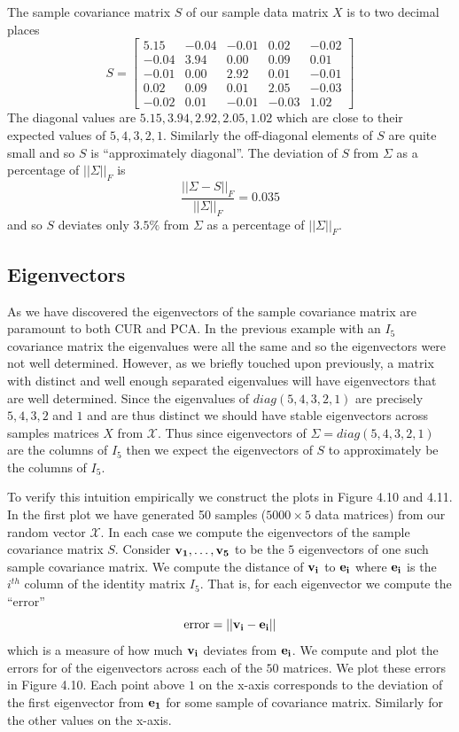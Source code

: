 \documentclass{book}
\newcommand{\bs}[1]{\boldsymbol{#1}}
\newcommand{\rv}[1]{\bs{\mathscr{#1}}}
\begin{document}
The sample covariance matrix $S$ of our sample data matrix $X$ is to two decimal places
$$
S=\begin{bmatrix}
5.15& -0.04& -0.01&  0.02& -0.02\\
-0.04&  3.94&  0.00&  0.09&  0.01\\
-0.01&  0.00&  2.92&  0.01& -0.01\\
 0.02&  0.09&  0.01&  2.05& -0.03\\
-0.02&  0.01& -0.01& -0.03&  1.02
\end{bmatrix}
$$
The diagonal values are $5.15,3.94,2.92,2.05,1.02$ which are close to their expected values of $5,4,3,2,1$. Similarly the off-diagonal elements of $S$ are quite small and so $S$ is ``approximately diagonal''. The deviation of $S$ from $\Sigma$ as a percentage of $||\Sigma||_F$ is
$$
\frac{||\Sigma-S||_F}{||\Sigma||_F}=0.035
$$
and so $S$ deviates only $3.5\%$ from $\Sigma$ as a percentage of $||\Sigma||_F$. 

\subsection{Eigenvectors}

As we have discovered the eigenvectors of the sample covariance matrix are paramount to both CUR and PCA. In the previous example with an $I_5$ covariance matrix the eigenvalues were all the same and so the eigenvectors were not well determined. However, as we briefly touched upon previously, a matrix with distinct and well enough separated eigenvalues will have eigenvectors that are well determined. Since the eigenvalues of $diag(5,4,3,2,1)$ are precisely $5,4,3,2$ and $1$ and are thus distinct we should have stable eigenvectors across samples matrices $X$ from $\rv{X}$. Thus since eigenvectors of $\Sigma=diag(5,4,3,2,1)$ are the columns of $I_5$ then we expect the eigenvectors of $S$ to approximately be the columns of $I_5$. 

To verify this intuition empirically we construct the plots in Figure 4.10 and 4.11. In the first plot we have generated 50 samples ($5000 \times 5$ data matrices) from our random vector $\rv{X}$. In each case we compute the eigenvectors of the sample covariance matrix $S$. Consider ${\bf v_1},\ldots,{\bf v_5}$ to be the $5$ eigenvectors of one such sample covariance matrix. We compute the distance of ${\bf v_i}$ to ${\bf e_i}$ where ${\bf e_i}$ is the $i^{th}$ column of the identity matrix $I_5$. That is, for each eigenvector we compute the ``error''
$$
\text{error}=||{\bf v_i}-{\bf e_i}||
$$
which is a measure of how much ${\bf v_i}$ deviates from ${\bf e_i}$. We compute and plot the errors for of the eigenvectors across each of the $50$ matrices. We plot these errors in Figure 4.10. Each point above $1$ on the x-axis corresponds to the deviation of the first eigenvector from ${\bf e_1}$ for some sample of covariance matrix. Similarly for the other values on the x-axis.
\end{document}
